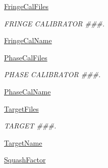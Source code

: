 \begin{DoxyCompactItemize}
\hyperlink{class_pipeline-0_1_1_pipeline_ae52daa85c6dff9b780ea8995e40677ef}{\-Fringe\-Cal\-Files}
\begin{DoxyCompactList}\small\item\em \-F\-R\-I\-N\-G\-E \-C\-A\-L\-I\-B\-R\-A\-T\-O\-R \#\#\#. \end{DoxyCompactList}\item 
\hyperlink{class_pipeline-0_1_1_pipeline_a0e085f0c7c5dbd7637240f5f6f93c59e}{\-Fringe\-Cal\-Name}
\item 
\hyperlink{class_pipeline-0_1_1_pipeline_a484223ba9b1f2acb42bcfc1c3354f447}{\-Phase\-Cal\-Files}
\begin{DoxyCompactList}\small\item\em \-P\-H\-A\-S\-E \-C\-A\-L\-I\-B\-R\-A\-T\-O\-R \#\#\#. \end{DoxyCompactList}\item 
\hyperlink{class_pipeline-0_1_1_pipeline_a6e9d9476a4ace145b50737936321c846}{\-Phase\-Cal\-Name}
\item 
\hyperlink{class_pipeline-0_1_1_pipeline_a9d79e26b87231189f3a7ad1e38801f79}{\-Target\-Files}
\begin{DoxyCompactList}\small\item\em \-T\-A\-R\-G\-E\-T \#\#\#. \end{DoxyCompactList}\item 
\hyperlink{class_pipeline-0_1_1_pipeline_a0f2274265851d6d0c0ce2ee9d281819f}{\-Target\-Name}
\item 
\hyperlink{class_pipeline-0_1_1_pipeline_aeeb9d9e4e2cdf49c7cef46466b5249cc}{\-Squash\-Factor}
\end{DoxyCompactItemize}


